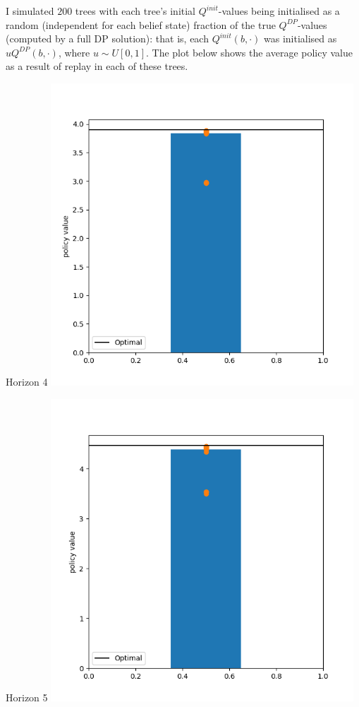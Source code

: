 \documentclass{article}
\begin{document}
I simulated $200$ trees with each tree's initial $Q^{init}$-values being initialised as a random (independent for each belief state) 
fraction of the true $Q^{DP}$-values (computed by a full DP solution): that is, each $Q^{init}(b, \cdot)$ was initialised as 
$uQ^{DP}(b, \cdot)$, where $u \sim U[0, 1]$. The plot below shows the average policy value as a result of replay in each of these trees.

\vspace*{0.4cm}

\begin{minipage}{0.5\textwidth}
    \centering
    Horizon 4
    \includegraphics[width=0.85\textwidth]{../figures/hor5/policy_value.png}
\end{minipage}%
\begin{minipage}{0.5\textwidth}
    \centering
    Horizon 5
    \includegraphics[width=0.85\textwidth]{../figures/hor6/policy_value.png}
\end{minipage}
\end{document}
